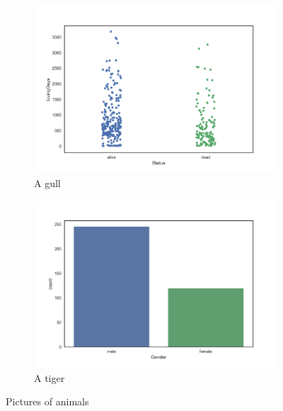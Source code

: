 \documentclass[a4paper,10pt]{article}
\begin{document}
\begin{figure}[bh]
    \centering
    \begin{subfigure}[h]{0.45\textwidth}
        \includegraphics[width=1.1\textwidth]{livingstatusandstatus.png}
        \caption{A gull}
        \label{fig:gull}
    \end{subfigure}
    \begin{subfigure}[h]{0.45\textwidth}
        \includegraphics[width=1.1\textwidth]{GenderVSstatus.png}
          \caption{A tiger}
          \label{fig:tiger}
    \end{subfigure}
    \caption{Pictures of animals}\label{fig:animals}
\end{figure}
  

 

 
 \subsection {}
\subsection {}





\end{document}
